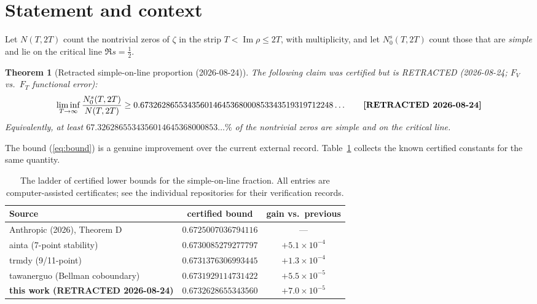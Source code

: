 \documentclass[11pt]{article}
\newtheorem{theorem}{Theorem}[section]
\newcommand{\Nc}{N_0^s}
\newcommand{\N}{N}
\begin{document}
\tableofcontents

\section{Statement and context}
\label{sec:statement}

Let $\N(T,2T)$ count the nontrivial zeros of $\zeta$ in the strip
$T<\operatorname{Im}\rho\le 2T$, with multiplicity, and let
$\Nc(T,2T)$ count those that are \emph{simple} and lie on the critical line
$\Re s=\tfrac12$.

\begin{theorem}[Retracted simple-on-line proportion (2026-08-24)]\label{thm:main}
The following claim was certified but is RETRACTED (2026-08-24; $F_V$ vs.\ $F_T$
functional error):
\begin{equation}
 \liminf_{T\to\infty}\frac{\Nc(T,2T)}{\N(T,2T)}
 \ge 0.673262865534356014645368000853343519319712248\ldots %
 \qquad \text{\textbf{[RETRACTED 2026-08-24]}}
 \label{eq:bound}
\end{equation}
Equivalently, at least $67.3262865534356014645368000853\ldots\%$ of the
nontrivial zeros are simple and on the critical line.
\end{theorem}

The bound (\ref{eq:bound}) is a genuine improvement over the current external
record.  Table~\ref{tab:ladder} collects the known certified constants for the
same quantity.

\begin{table}[ht]
\centering
\begin{tabular}{lcc}
\toprule
Source & certified bound & gain vs.\ previous \\
\midrule
Anthropic (2026), Theorem D \cite{claude2026} & $0.6725007036794116$ & --- \\
ainta \cite{ainta} (7-point stability) & $0.6730085279277797$ & $+5.1\times10^{-4}$ \\
trmdy \cite{trmdy} (9/11-point) & $0.6731376306993445$ & $+1.3\times10^{-4}$ \\
tawanerguo \cite{tawanerguo} (Bellman coboundary) & $0.6731929114731422$ & $+5.5\times10^{-5}$ \\
\textbf{this work (RETRACTED 2026-08-24)} & \textbf{$0.6732628655343560$} & \textbf{$+7.0\times10^{-5}$} \\
\bottomrule
\end{tabular}
\caption{The ladder of certified lower bounds for the simple-on-line fraction.
All entries are computer-assisted certificates; see the individual repositories
for their verification records.}
\label{tab:ladder}
\end{table}
\end{document}
